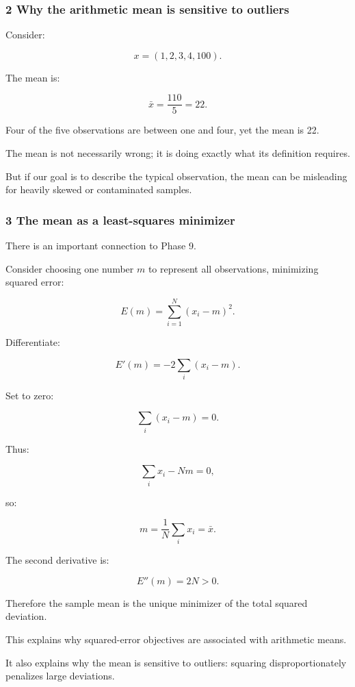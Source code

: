 \subsubsection{2 Why the arithmetic mean is sensitive to outliers}\label{02-foundations-ii-ch030-why-the-arithmetic-mean-is-sensitive-to-outliers}

Consider:

\[
 x=(1,2,3,4,100).
\]

The mean is:

\[
 \bar x=\frac{110}{5}=\boxed{22}.
\]

Four of the five observations are between one and four, yet the mean is 22.

The mean is not necessarily wrong; it is doing exactly what its definition requires.

But if our goal is to describe the typical observation, the mean can be misleading for heavily skewed or contaminated samples.

\subsubsection{3 The mean as a least-squares minimizer}\label{02-foundations-ii-ch030-the-mean-as-a-least-squares-minimizer}

There is an important connection to Phase 9.

Consider choosing one number \(m\) to represent all observations, minimizing squared error:

\[
 E(m)= \sum_{i=1}^{N}(x_i-m)^2.
\]

Differentiate:

\[
 E'(m)= -2\sum_i(x_i-m).
\]

Set to zero:

\[
 \sum_i(x_i-m)=0.
\]

Thus:

\[
 \sum_ix_i-Nm=0,
\]

so:

\[
 \boxed{ m=\frac1N\sum_ix_i=\bar x }.
\]

The second derivative is:

\[
 E''(m)=2N>0.
\]

Therefore the sample mean is the unique minimizer of the total squared deviation.

This explains why squared-error objectives are associated with arithmetic means.

It also explains why the mean is sensitive to outliers: squaring disproportionately penalizes large deviations.

